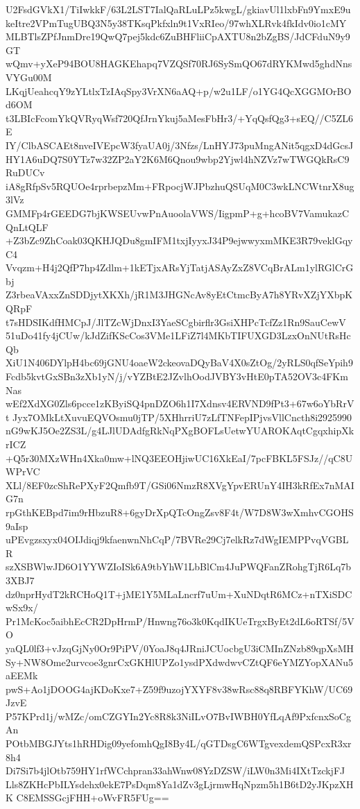 U2FsdGVkX1/TiIwkkF/63L2LST7IalQaRLuLPz5kwgL/gkiavUl1lxbFn9YmxE9u
keItre2VPmTugUBQ3N5y38TKsqPkfxln9t1VxRIeo/97whXLRvk4fkIdv0io1cMY
MLBTlsZPfJnmDre19QwQ7pej5kdc6ZuBHFliiCpAXTU8n2bZgBS/JdCFduN9y9GT
wQmv+yXeP94BOU8HAGKEhapq7VZQSf70RJ6SySmQO67dRYKMwd5ghdNnsVYGu00M
LKqjUeahcqY9zYLtlxTzIAqSpy3VrXN6aAQ+p/w2u1LF/o1YG4QcXGGMOrBOd6OM
t3LBIcFcomYkQVRyqWsf720QfJrnYkuj5aMesFbHr3/+YqQsfQg3+sEQ//C5ZL6E
IY/ClbASCAEt8nveIVEpcW3fyaUA0j/3Nfzs/LnHYJ73puMngANit5qgxD4dGcsJ
HY1A6uDQ7S0YTz7w32ZP2aY2K6M6Qnou9wbp2Yjwl4hNZVz7wTWGQkRsC9RuDUCv
iA8gRfpSv5RQUOe4rprbepzMm+FRpocjWJPbzhuQSUqM0C3wkLNCWtnrX8ug3lVz
GMMFp4rGEEDG7bjKWSEUvwPnAuoolaVWS/IigpmP+g+hcoBV7VamukazCQnLtQLF
+Z3bZc9ZhCoak03QKHJQDu8gmIFM1txjIyyxJ34P9ejwwyxmMKE3R79veklGqyC4
Vvqzm+H4j2QfP7hp4Zdlm+1kETjxARsYjTatjASAyZxZ8VCqBrALm1ylRGlCrGbj
Z3rbeaVAxxZnSDDjytXKXh/jR1M3JHGNcAv8yEtCtmcByA7h8YRvXZjYXbpKQRpF
t7sHDSIKdfHMCpJ/JlTZcWjDnxI3YaeSCgbirflr3GsiXHPcTcfZz1Rn9SauCewV
51uDo41fy4jCUw/kJdZifKScCos3VMe1LFiZ7l4MKbTIFUXGD3LzxOnNUtRsHcQb
XiU1N406DYlpH4bc69jGNU4oaeW2ckeovaDQyBaV4X0sZtOg/2yRLS0qfSeYpih9
Fcdb5kvtGxSBn3zXb1yN/j/vYZBtE2JZvlhOodJVBY3vHtE0pTA52OV3c4FKmNas
wEf2XdXG0Zls6pcce1zKByiSQ4pnDZO6h1I7Xdnsv4ERVND9fPt3+67w6oYbRrVt
Jyx7OMkLtXuvuEQVOsmu0jTP/5XHhrriU7zLfTNFepIPjvsVllCncth8i2925990
nG9wKJ5Oe2ZS3L/g4LJlUDAdfgRkNqPXgBOFLsUetwYUAROKAqtCgqxhipXkrICZ
+Q5r30MXzWHn4Xka0mw+lNQ3EEOHjiwUC16XkEaI/7pcFBKL5FSJz//qC8UWPrVC
XLl/8EF0zcShRePXyF2Qmfb9T/GSi06NmzR8XVgYpvERUnY4IH3kRfEx7nMAIG7n
rpGthKEBpd7im9rHbzuR8+6gyDrXpQTcOngZsv8F4t/W7D8W3wXmhvCGOHS9aIsp
uPEvgzsxyx04OIJdiqj9kfaenwnNhCqP/7BVRe29Cj7elkRz7dWgIEMPPvqVGBLR
szXSBWlwJD6O1YYWZIoISk6A9tbYhW1LbBlCm4JuPWQFanZRohgTjR6Lq7b3XBJ7
dz0nprHydT2kRCHoQ1T+jME1Y5MLaLncrf7uUm+XuNDqtR6MCz+nTXiSDCwSx9x/
Pr1McKoc5aibhEcCR2DpHrmP/Hnwng76o3k0KqdIKUeTrgxByEt2dL6oRTSf/5VO
yaQL0lf3+vJzqGjNy0Or9PiPV/0YoaJ8q4JRniJCUocbgU3iCMInZNzb89qpXsMH
Sy+NW8Ome2urvcoe3gnrCxGKHlUPZo1ysdPXdwdwvCZtQF6eYMZYopXANu5aEEMk
pwS+Ao1jDOOG4ajKDoKxe7+Z59f9uzojYXYF8v38wRsc88q8RBFYKhW/UC69JzvE
P57KPrd1j/wMZc/omCZGYIn2Yc8R8k3NiILvO7BvIWBH0YfLqAf9PxfcnxSoCgAn
POtbMBGJYts1hRHDig09yefomhQgI8By4L/qGTDsgC6WTgvexdemQSPcxR3xr8h4
Di7Si7b4jlOtb759HY1rfWCchpran33ahWnw08YzDZSW/iLW0n3Mi4IXtTzckjFJ
Lls8ZKHcPbILYsdehx0ekE7PsDqm8Ya1dZv3gLjrmwHqNpzm5h1B6tD2yJKpzXHK
C8EMSSGcjFHH+oWvFR5FUg==
